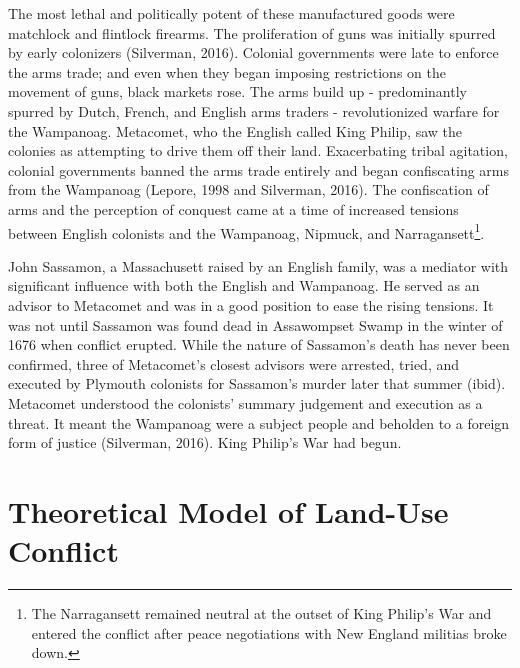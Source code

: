 \documentclass[sn-mathphys]{sn-jnl}%
\theoremstyle{thmstyleone}%
\theoremstyle{thmstyletwo}%
\theoremstyle{thmstylethree}%
\begin{document}
The most lethal and politically potent of these manufactured goods were matchlock and flintlock firearms. The proliferation of guns was initially spurred by early colonizers (Silverman, 2016). Colonial governments were late to enforce the arms trade; and even when they began imposing restrictions on the movement of guns, black markets rose. The arms build up - predominantly spurred by Dutch, French, and English arms traders - revolutionized warfare for the Wampanoag. Metacomet, who the English called King Philip, saw the colonies as attempting to drive them off their land. Exacerbating tribal agitation, colonial governments banned the arms trade entirely and began confiscating arms from the Wampanoag (Lepore, 1998 and Silverman, 2016). The confiscation of arms and the perception of conquest came at a time of increased tensions between English colonists and the Wampanoag, Nipmuck, and Narragansett\footnote{The Narragansett remained neutral at the outset of King Philip's War and entered the conflict after peace negotiations with New England militias broke down.}. 

John Sassamon, a Massachusett raised by an English family, was a mediator with significant influence with both the English and Wampanoag. He served as an advisor to Metacomet and was in a good position to ease the rising tensions. It was not until Sassamon was found dead in Assawompset Swamp in the winter of 1676 when conflict erupted. While the nature of Sassamon's death has never been confirmed, three of Metacomet's closest advisors were arrested, tried, and executed by Plymouth colonists for Sassamon's murder later that summer (ibid). Metacomet understood the colonists' summary judgement and execution as a threat. It meant the Wampanoag were a subject people and beholden to a foreign form of justice (Silverman, 2016). King Philip's War had begun.

\section{Theoretical Model of Land-Use Conflict}\label{sec3}


\end{document}
